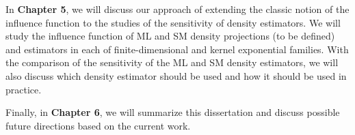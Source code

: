\documentclass[12pt]{article}
\theoremstyle{definition}
\theoremstyle{theorem}
\theoremstyle{remark}
\begin{document}
In \textbf{\color{red}Chapter 5}, we will discuss our approach of extending the classic notion of the influence function to the studies of the sensitivity of density estimators. We will study the influence function of ML and SM density projections (to be defined) and estimators in each of finite-dimensional and kernel exponential families. With the comparison of the sensitivity of the ML and SM density estimators, we will also discuss which density estimator should be used and how it should be used in practice. 

Finally, in \textbf{\color{red}Chapter 6}, we will summarize this dissertation and discuss possible future directions based on the current work. 

\newpage

\printbibliography
\end{document}
